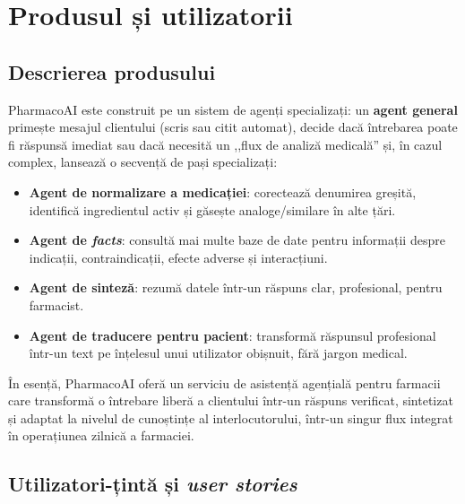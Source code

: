 \section{Produsul și utilizatorii}

\subsection{Descrierea produsului}
PharmacoAI este construit pe un sistem de agenți specializați: un \textbf{agent general} primește mesajul clientului (scris sau citit automat), decide dacă întrebarea poate fi răspunsă imediat sau dacă necesită un ,,flux de analiză medicală'' și, în cazul complex, lansează o secvență de pași specializați:

\begin{itemize}
    \item \textbf{Agent de normalizare a medicației}: corectează denumirea greșită, identifică ingredientul activ și găsește analoge/similare în alte țări.
    \item \textbf{Agent de \textit{facts}}: consultă mai multe baze de date pentru informații despre indicații, contraindicații, efecte adverse și interacțiuni.
    \item \textbf{Agent de sinteză}: rezumă datele într-un răspuns clar, profesional, pentru farmacist.
    \item \textbf{Agent de traducere pentru pacient}: transformă răspunsul profesional într-un text pe înțelesul unui utilizator obișnuit, fără jargon medical.
\end{itemize}

În esență, PharmacoAI oferă un serviciu de asistență agențială pentru farmacii care transformă o întrebare liberă a clientului într-un răspuns verificat, sintetizat și adaptat la nivelul de cunoștințe al interlocutorului, într-un singur flux integrat în operațiunea zilnică a farmaciei.

\subsection{Utilizatori-țintă și \textit{user stories}}

